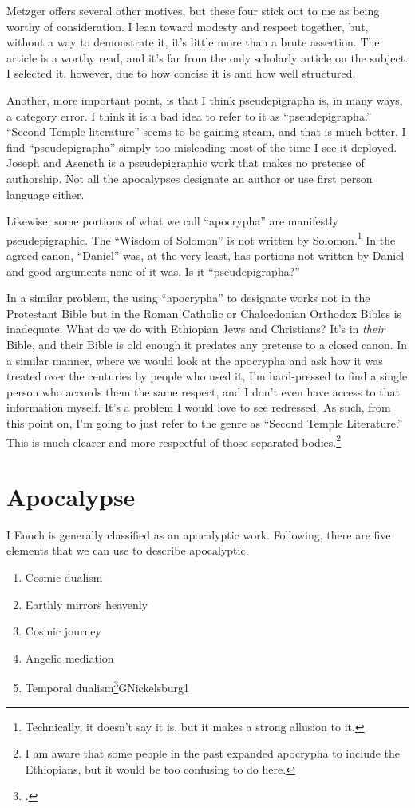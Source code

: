 \documentclass{article}
\begin{document}
Metzger offers several other motives, but these four stick out to me as being worthy of consideration.
I lean toward modesty and respect together, but, without a way to demonstrate it, it's little more than a brute assertion.
The article is a worthy read, and it's far from the only scholarly article on the subject.
I selected it, however, due to how concise it is and how well structured.

Another, more important point, is that I think pseudepigrapha is, in many ways, a category error.
I think it is a bad idea to refer to it as ``pseudepigrapha.''
``Second Temple literature'' seems to be gaining steam, and that is much better.
I find ``pseudepigrapha'' simply too misleading most of the time I see it deployed.
Joseph and Aseneth is a pseudepigraphic work that makes no pretense of authorship.
Not all the apocalypses designate an author or use first person language either.

Likewise, some portions of what we call ``apocrypha'' are manifestly pseudepigraphic.
The ``Wisdom of Solomon'' is not written by Solomon.\footnote{
	Technically, it doesn't say it is, but it makes a strong allusion to it.
}
In the agreed canon, ``Daniel'' was, at the very least, has portions not written by Daniel and good arguments none of it was.
Is it ``pseudepigrapha?''

In a similar problem, the using ``apocrypha'' to designate works not in the Protestant Bible but in the Roman Catholic or Chalcedonian Orthodox Bibles is inadequate.
What do we do with Ethiopian Jews and Christians?
It's in \emph{their} Bible, and their Bible is old enough it predates any pretense to a closed canon.
In a similar manner, where we would look at the apocrypha and ask how it was treated over the centuries by people who used it, I'm hard-pressed to find a single person who accords them the same respect, and I don't even have access to that information myself.
It's a problem I would love to see redressed.
As such, from this point on, I'm going to just refer to the genre as ``Second Temple Literature.''
This is much clearer and more respectful of those separated bodies.\footnote{
	I am aware that some people in the past expanded apocrypha to include the Ethiopians, but it would be too confusing to do here.
}

\section{Apocalypse}

I Enoch is generally classified as an apocalyptic work.
Following, there are five elements that we can use to describe apocalyptic.
\begin{enumerate}
  \item Cosmic dualism
  \item Earthly mirrors heavenly
  \item Cosmic journey
  \item Angelic mediation
  \item Temporal dualism\footcite{37-40}{GNickelsburg1}
\end{enumerate}
\end{document}

